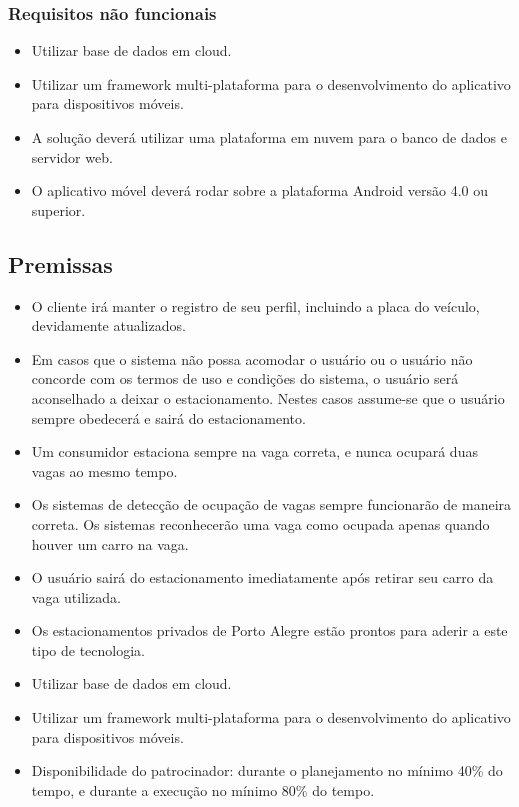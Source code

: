 \subsubsection{Requisitos não funcionais}

\begin{itemize}
	\item Utilizar base de dados em cloud.
	\item Utilizar um framework multi-plataforma para o desenvolvimento do aplicativo para dispositivos móveis.
	\item A solução deverá utilizar uma plataforma em nuvem para o banco de dados e servidor web.
	\item O aplicativo móvel deverá rodar sobre a plataforma Android versão 4.0 ou superior.
\end{itemize}

\subsection{Premissas}

\begin{itemize}
	\item O cliente irá manter o registro de seu perfil, incluindo a placa do veículo, devidamente atualizados.
	\item Em casos que o sistema não possa acomodar o usuário ou o usuário não concorde com os termos de uso e condições do sistema, o usuário será aconselhado a deixar o estacionamento. Nestes casos assume-se que o usuário sempre obedecerá e sairá do estacionamento.
	\item Um consumidor estaciona sempre na vaga correta, e nunca ocupará duas vagas ao mesmo tempo.
	\item Os sistemas de detecção de ocupação de vagas sempre funcionarão de maneira correta. Os sistemas reconhecerão uma vaga como ocupada apenas quando houver um carro na vaga.
	\item O usuário sairá do estacionamento imediatamente após retirar seu carro da vaga utilizada.
	\item Os estacionamentos privados de Porto Alegre estão prontos para aderir a este tipo de tecnologia.
	\item Utilizar base de dados em cloud.
	\item Utilizar um framework multi-plataforma para o desenvolvimento do aplicativo para dispositivos móveis.
	\item Disponibilidade do patrocinador: durante o planejamento no mínimo 40\% do tempo, e durante a execução no mínimo 80\% do tempo.
\end{itemize}

